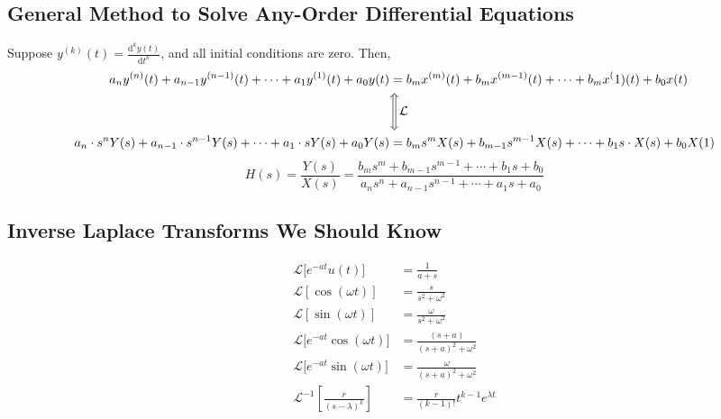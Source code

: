 \documentclass[10pt]{article}
\newcommand{\laplace}{\mathcal{L}}
\newcommand{\dd}{\text{d}}
\begin{document}
\subsection*{General Method to Solve Any-Order Differential Equations}
Suppose $y^{(k)}(t) = \frac{\dd^k y(t)}{\dd t^k}$, and all initial conditions are zero.
Then,
\begin{align*}
    a_n y^{(n)}(t) + a_{n-1} y^{(n-1)}(t) + \cdots + a_1 y^{(1)}(t) + a_0 y(t) &= b_m x^{(m)}(t) + b_m x^{(m - 1)}(t) + \cdots + b_m x^(1) (t) + b_0 x(t)\\
    &\Bigg\Updownarrow \laplace\\
    a_n \cdot s^n Y(s) + a_{n-1} \cdot s^{n-1} Y(s) + \cdots + a_1 \cdot s Y(s) + a_0 Y(s) &= b_m s^m X(s) + b_{m-1} s^{m-1} X(s) + \cdots + b_1 s\cdot X(s) + b_0 X(1)
\end{align*}
\[H(s) = \frac{Y(s)}{X(s)} = \frac{b_m s^m + b_{m - 1} s^{m - 1} + \cdots + b_1 s + b_0}{a_n s^n + a_{n - 1} s^{n - 1} + \cdots + a_1 s + a_0}\]

\subsection*{Inverse Laplace Transforms We Should Know}
\begin{align*}
    \laplace\big[e^{-at} u(t)] &= \frac{1}{a + s}\\
    \laplace[\cos(\omega t)] &= \frac{s}{s^2 + \omega^2}\\
    \laplace[\sin(\omega t)] &= \frac{\omega}{s^2 + \omega^2}\\
    \laplace\big[e^{-at} \cos(\omega t)] &= \frac{(s + a)}{(s + a)^2 + \omega^2}\\
    \laplace\big[e^{-at} \sin(\omega t)] &= \frac{\omega}{(s + a)^2 + \omega^2}\\
    \laplace^{-1} \left[\frac{r}{(s - \lambda)^k}\right] &= \frac{r}{(k - 1)!} t^{k - 1} e^{\lambda t}
\end{align*}
\end{document}
